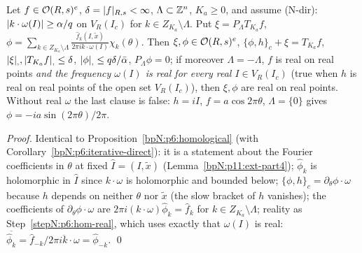 \begin{proposition}\label{bpN:p11:hom}
Let $f\in\mathcal O(R,s)^e$, $\delta=\lvert f\rvert_{R,s}<\infty$, $\Lambda\subset\mathbb{Z}^n$, $K_a\ge0$, and assume (N-dir): $\lvert k\cdot\omega(I)\rvert\ge\alpha/q$ on $V_R(I_c)$ for $k\in Z_{K_a}\setminus\Lambda$. Put $\xi=P_\Lambda T_{K_a}f$, $\phi=\sum_{k\in Z_{K_a}\setminus\Lambda}\frac{\hat f_k(I,\tilde x)}{2\pi ik\cdot\omega(I)}\chi_k(\theta)$. Then $\xi,\phi\in\mathcal O(R,s)^e$, $\{\phi,h\}_c+\xi=T_{K_a}f$, $\lvert \xi\rvert_{,},\lvert T_{K_a}f\rvert_{,}\le\delta$, $\lvert \phi\rvert_{,}\le q\delta/\bar\alpha$, $P_\Lambda\phi=0$; if moreover $\Lambda=-\Lambda$, $f$ is real on real points \emph{and the frequency $\omega(I)$ is real for every real $I\in V_R(I_c)$} (true when $h$ is real on real points of the open set $V_R(I_c)$), then $\xi,\phi$ are real on real points. Without real $\omega$ the last clause is false: $h=iI$, $f=a\cos2\pi\theta$, $\Lambda=\{0\}$ gives $\phi=-ia\sin(2\pi\theta)/2\pi$.
\end{proposition}
\begin{proof}
Identical to Proposition~\ref{bpN:p6:homological} (with Corollary~\ref{bpN:p6:iterative-direct}): it is a statement about the Fourier coefficients in $\theta$ at fixed $\hat I=(I,\tilde x)$ (Lemma~\ref{bpN:p11:ext-part4}); $\hat\phi_k$ is holomorphic in $\hat I$ since $k\cdot\omega$ is holomorphic and bounded below; $\{\phi,h\}_c=\partial_\theta\phi\cdot\omega$ because $h$ depends on neither $\theta$ nor $\tilde x$ (the slow bracket of $h$ vanishes); the coefficients of $\partial_\theta\phi\cdot\omega$ are $2\pi i(k\cdot\omega)\hat\phi_k=\hat f_k$ for $k\in Z_{K_a}\setminus\Lambda$; reality as Step~\ref{stepN:p6:hom-real}, which uses exactly that $\omega(I)$ is real: $\overline{\hat\phi_k}=\hat f_{-k}/\overline{2\pi ik\cdot\omega}=\hat\phi_{-k}$. \qed
\end{proof}

